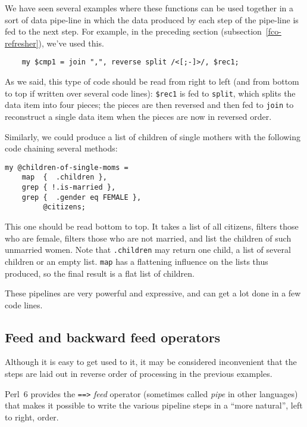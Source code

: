 We have seen several examples where these functions can 
be used together in a sort of data pipe-line in which 
the data produced by each step of the pipe-line is fed 
to the next step. For example, in the preceding section 
(subsection~\ref{fco-refresher}), we've used this.

\begin{verbatim}
    my $cmp1 = join ",", reverse split /<[;-]>/, $rec1;
\end{verbatim}

As we said, this type of code should be read from right 
to left (and from bottom to top if written over several 
code lines): \verb'$rec1' is fed to {\tt split}, which 
splits the data item into four pieces; the pieces are then 
reversed and then fed to {\tt join} to reconstruct a single 
data item when the pieces are now in reversed order.

Similarly, we could produce a list of children of single 
mothers with the following code chaining several methods:

\begin{verbatim}
my @children-of-single-moms =
    map  {  .children },
    grep { !.is-married },
    grep {  .gender eq FEMALE },
         @citizens;
\end{verbatim}

This one should be read bottom to top. It takes a list 
of all citizens, filters those who are female, filters 
those who are not married, and list the children of 
such unmarried women. Note that {\tt .children} may 
return one child, a list of several children or an 
empty list. {\tt map} has a flattening influence 
on the lists thus produced, so the final result is 
a flat list of children.

These pipelines are very powerful and expressive, and 
can get a lot done in a few code lines.

\subsection{Feed and backward feed operators}

Although it is easy to get used to it, it may be 
considered inconvenient that the steps are laid 
out in reverse order of processing in the previous 
examples.

Perl~6 provides the \verb'==>' \emph{feed} operator 
(sometimes called \emph{pipe} in other languages) 
that makes it possible to write the various pipeline 
steps in a ``more natural'', left to right, order.

